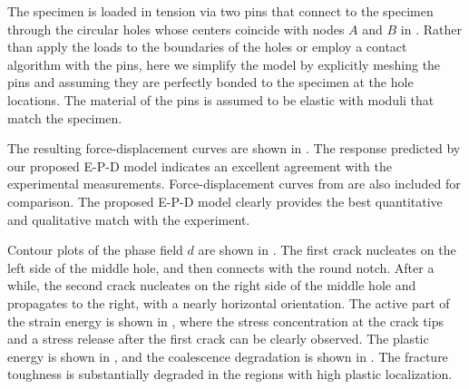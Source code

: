 The specimen is loaded in tension via two pins that connect to the specimen through the circular holes whose centers coincide with nodes $A$ and $B$ in .  Rather than apply the loads to the boundaries of the holes or employ a contact algorithm with the pins, here we simplify the model by explicitly meshing the pins and assuming they are perfectly bonded to the specimen at the hole locations.  The material of the pins is    assumed to be elastic with moduli that match the specimen.



The resulting force-displacement curves are shown in . The response predicted by our proposed E-P-D model indicates an excellent agreement with the experimental measurements. Force-displacement curves from \cite{ambati_phase-field_2016} are also included for comparison.  The proposed E-P-D model clearly provides the best quantitative and qualitative match with the experiment.

Contour plots of the phase field $d$ are shown in . The first crack nucleates on the left side of the middle hole, and then connects with the round notch. After a while, the second crack nucleates on the right side of the middle hole and propagates to the right, with a nearly horizontal orientation.
The active part of the strain energy is shown in , where the stress concentration at the crack tips and a stress release after the first crack can be clearly observed.
The plastic energy is shown in , and the coalescence degradation is shown in . The fracture toughness is substantially degraded in the regions with high plastic localization.




